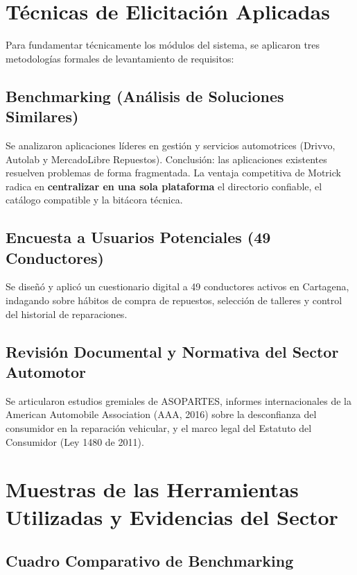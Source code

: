 \documentclass[11pt,letterpaper]{article}
\begin{document}
\section{Técnicas de Elicitación Aplicadas}

Para fundamentar técnicamente los módulos del sistema, se aplicaron tres metodologías formales de levantamiento de requisitos:

\subsection{Benchmarking (Análisis de Soluciones Similares)}
Se analizaron aplicaciones líderes en gestión y servicios automotrices (Drivvo, Autolab y MercadoLibre Repuestos). Conclusión: las aplicaciones existentes resuelven problemas de forma fragmentada. La ventaja competitiva de Motrick radica en \textbf{centralizar en una sola plataforma} el directorio confiable, el catálogo compatible y la bitácora técnica.

\subsection{Encuesta a Usuarios Potenciales (49 Conductores)}
Se diseñó y aplicó un cuestionario digital a 49 conductores activos en Cartagena, indagando sobre hábitos de compra de repuestos, selección de talleres y control del historial de reparaciones.

\subsection{Revisión Documental y Normativa del Sector Automotor}
Se articularon estudios gremiales de ASOPARTES, informes internacionales de la American Automobile Association (AAA, 2016) sobre la desconfianza del consumidor en la reparación vehicular, y el marco legal del Estatuto del Consumidor (Ley 1480 de 2011).

\newpage

\section{Muestras de las Herramientas Utilizadas y Evidencias del Sector}

\subsection{Cuadro Comparativo de Benchmarking}
\end{document}
